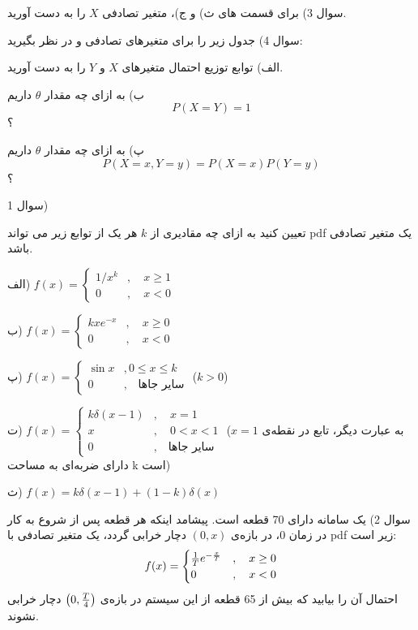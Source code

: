 \documentclass[10pt,letterpaper]{article}
\begin{document}
سوال 3) برای قسمت های ث) و ج)،  متغیر تصادفی $X$ را به دست آورید.

سوال 4) جدول زیر را برای متغیرهای تصادفی  و  در نظر بگیرید:
\begin{table}[h]
\centering
\Large
{}
\end{table}
الف) توابع توزیع احتمال متغیرهای $X$ و $Y$ را به دست آورید.

ب) به ازای چه مقدار $\theta$ داریم
$$
P(X=Y)=1
$$
؟

پ) به ازای چه مقدار $\theta$ داریم
$$
P(X=x,Y=y)=P(X=x)P(Y=y)
$$
؟

سوال 1)

تعیین کنید به ازای چه مقادیری از $k$ هر یک از توابع زیر می تواند pdf یک متغیر تصادفی باشد.

الف) 
$
f(x)=\begin{cases}
1/x^k&,\quad x\ge 1\\
0&,\quad x<0
\end{cases}
$

ب)
$
f(x)=\begin{cases}
kxe^{-x}&,\quad x\ge 0\\
0&,\quad x<0
\end{cases}
$

پ)
$
f(x)=\begin{cases}
\sin x&,0\le x\le k\\
0&,\quad \text{سایر جاها}
\end{cases}
$
 ($k>0$)

ت)
$
f(x)=\begin{cases}
k\delta(x-1)&,\quad x=1\\
x&,\quad 0<x<1\\
0&,\quad \text{سایر جاها}
\end{cases}
$
(به عبارت دیگر، تابع در نقطه‌ی $x=1$ دارای ضربه‌ای به مساحت k است)

ث)
$
f(x)=k\delta(x-1)+(1-k)\delta(x)
$

سوال 2) یک سامانه دارای 70 قطعه است. پیشامد اینکه هر قطعه پس از شروع به کار در زمان 0، در بازه‌ی 
$
(0,x)
$
دچار خرابی گردد، یک متغیر تصادفی با pdf زیر است:
$$
f(x)=\begin{cases}
{1\over T}e^{-{x\over T}}&,\quad x\ge 0\\
0&,\quad x<0
\end{cases}
$$
احتمال آن را بیابید که بیش از 65 قطعه از این سیستم در بازه‌ی 
$
\left(0,{T\over 4}\right)
$
 دچار خرابی نشوند.
\end{document}

